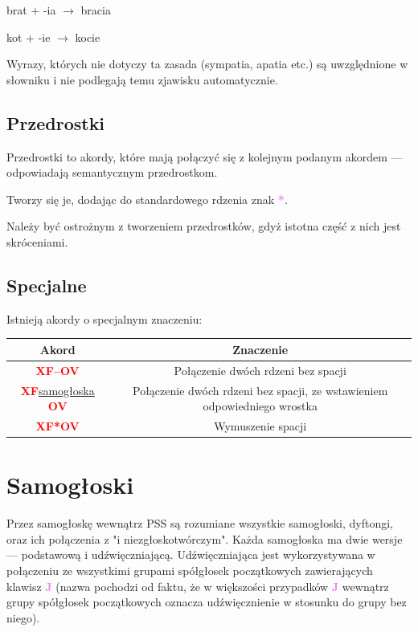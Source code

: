 \documentclass[12p, oneside]{book}
\newcommand{\steno}[1]{\textbf{\textsf{\textcolor{violet}{ #1}}}}
\newcommand{\stenoExc}[1]{\textbf{\textsf{\textcolor{red}{ #1}}}}
\begin{document}
\begin{center}
brat + -ia $\rightarrow$ bracia

kot + -ie $\rightarrow$ kocie
\end{center}

Wyrazy, których nie dotyczy ta zasada (sympatia, apatia etc.) są uwzględnione w słowniku i nie podlegają temu zjawisku automatycznie.

\subsection{Przedrostki}
Przedrostki to akordy, które mają połączyć się z kolejnym podanym akordem --- odpowiadają semantycznym przedrostkom.

Tworzy się je, dodając do standardowego rdzenia znak \steno{*}.

Należy być ostrożnym z tworzeniem przedrostków, gdyż istotna część z nich jest skróceniami.

\subsection{Specjalne}
Istnieją akordy o specjalnym znaczeniu:

\begin{tabular}{| c | c |}
	\hline
	Akord & Znaczenie \\ \hline
	\stenoExc{XF--OV} & Połączenie dwóch rdzeni bez spacji \\ \hline
	\stenoExc{XF}\hyperref[sec:samogloski]{samogłoska}\stenoExc{OV} & Połączenie dwóch rdzeni bez spacji, ze wstawieniem odpowiedniego wrostka \\ \hline
	\stenoExc{XF*OV} & Wymuszenie spacji \\ \hline
\end{tabular}

\section{Samogłoski}
\label{sec:samogloski}
Przez samogłoskę wewnątrz PSS są rozumiane wszystkie samogłoski, dyftongi, oraz ich połączenia z "i niezgłoskotwórczym". Każda samogłoska ma dwie wersje --- podstawową i udźwięczniającą. Udźwięczniająca jest wykorzystywana w połączeniu ze wszystkimi grupami spółgłosek początkowych zawierających klawisz \steno{J} (nazwa pochodzi od faktu, że w większości przypadków \steno{J} wewnątrz grupy spółgłosek początkowych oznacza udźwięcznienie w stosunku do grupy bez niego).
\end{document}
